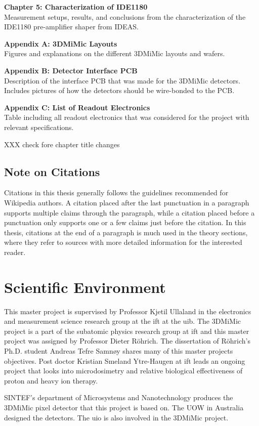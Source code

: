 \documentclass[../main/thesis.tex]{subfiles}
\begin{document}
\textbf{Chapter 5: Characterization of IDE1180}\\
Measurement setups, results, and conclusions from the characterization of the IDE1180 pre-amplifier shaper from IDEAS.

\textbf{Appendix A: 3DMiMic Layouts}\\
Figures and explanations on the different 3DMiMic layouts and wafers. 

\textbf{Appendix B: Detector Interface PCB}\\
Description of the interface PCB that was made for the 3DMiMic detectors. Includes pictures of how the detectors should be wire-bonded to the PCB. 

\textbf{Appendix C: List of Readout Electronics}\\
Table including all readout electronics that was considered for the project with relevant specifications. 

XXX check fore chapter title changes

\subsection{Note on Citations}
Citations in this thesis generally follows the guidelines recommended for Wikipedia authors. A citation placed after the last punctuation in a paragraph supports multiple claims through the paragraph, while a citation placed before a punctuation only supports one or a few claims just before the citation. In this thesis, citations at the end of a paragraph is much used in the theory sections, where they refer to sources with more detailed information for the interested reader.

\section{Scientific Environment}
\label{i-environment}
This master project is supervised by Professor Kjetil Ullaland in the electronics and measurement science research group at the \gls{ift} at the \gls{uib}. The 3DMiMic project is a part of the subatomic physics research group at \gls{ift} and this master project was assigned by Professor Dieter Röhrich. The dissertation of Röhrich's Ph.D. student Andreas Tefre Samnøy shares many of this master projects objectives. Post doctor Kristian Smeland Ytre-Haugen at \gls{ift} leads an ongoing project that looks into microdosimetry and relative biological effectiveness of proton and heavy ion therapy. 

SINTEF's department of Microsystems and Nanotechnology produces the 3DMiMic pixel detector that this project is based on. The \gls{UOW} in Australia designed the detectors. The \gls{uio} is also involved in the 3DMiMic project. 

\end{document}
